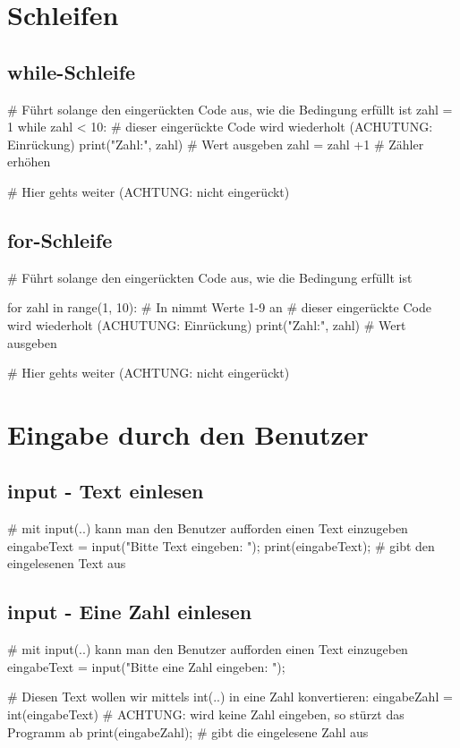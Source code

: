 \documentclass{\VorlagenPfad/coderdojokatext}
\begin{document}
\section{Schleifen}

\subsection{while-Schleife}
\begin{pythoncode}
# Führt solange den eingerückten Code aus, wie die Bedingung erfüllt ist
zahl = 1
while zahl < 10: 
	# dieser eingerückte Code wird wiederholt (ACHUTUNG: Einrückung)
	print("Zahl:", zahl) # Wert ausgeben
	zahl = zahl +1 # Zähler erhöhen

# Hier gehts weiter (ACHTUNG: nicht eingerückt)
\end{pythoncode}

\subsection{for-Schleife}
\begin{pythoncode}
# Führt solange den eingerückten Code aus, wie die Bedingung erfüllt ist

for zahl in range(1, 10): # In nimmt Werte 1-9 an
	# dieser eingerückte Code wird wiederholt (ACHUTUNG: Einrückung)
	print("Zahl:", zahl) # Wert ausgeben

# Hier gehts weiter (ACHTUNG: nicht eingerückt)
\end{pythoncode}

\section{Eingabe durch den Benutzer}
\subsection{input - Text einlesen}
\begin{pythoncode}
# mit input(..) kann man den Benutzer aufforden einen Text einzugeben
eingabeText = input("Bitte Text eingeben: "); 
print(eingabeText); # gibt den eingelesenen Text aus
\end{pythoncode}

\subsection{input - Eine Zahl einlesen}
\begin{pythoncode}
# mit input(..) kann man den Benutzer aufforden einen Text einzugeben
eingabeText = input("Bitte eine Zahl eingeben: "); 

# Diesen Text wollen wir mittels int(..) in eine Zahl konvertieren:
eingabeZahl = int(eingabeText) 
# ACHTUNG: wird keine Zahl eingeben, so stürzt das Programm ab
print(eingabeZahl); # gibt die eingelesene Zahl aus
\end{pythoncode}
\end{document}
